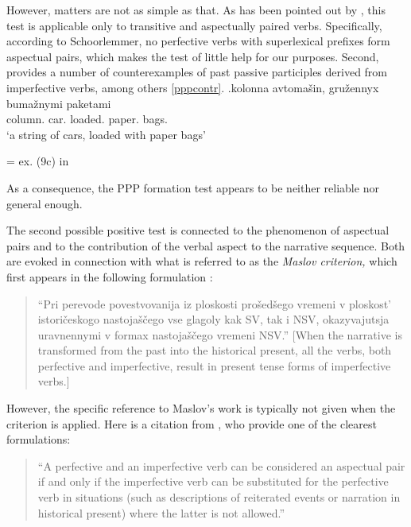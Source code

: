 However, matters are not as simple as that. As has been pointed out by \citet{Schoorlemmer:95}, this test is applicable only to transitive and aspectually paired verbs. Specifically, according to Schoorlemmer, no perfective verbs with superlexical prefixes form aspectual pairs, which makes the test of little help for our purposes. Second, \citet{Romanova:06} provides a number of counterexamples of past passive participles derived from imperfective verbs, among others \ref{pppcontr}.
\exg.\label{pppcontr}kolonna avtoma\v{s}in, gru\v{z}ennyx buma\v{z}nymi paketami \\
column. car. loaded. paper. bags.\\
\vspace{0.5em}
`a string of cars, loaded with paper bags'\\
\vspace{-0.5em}
\begin{flushright}
= ex. (9c) in \citet[5]{Romanova:06}
\end{flushright}

As a consequence, the PPP formation test appears to be neither reliable nor general enough.

The second possible positive test is connected to the phenomenon of aspectual pairs and to the contribution of the verbal aspect to the narrative sequence. Both are evoked in connection with what is referred to as the \textit{Maslov criterion,} which first appears in the following formulation \citep[][76--77]{Maslov:04}: 
\begin{quote}
``Pri perevode povestvovanija iz ploskosti pro\v{s}ed\v{s}ego vremeni v ploskost' istori\v{c}eskogo nastoja\v{s}\v{c}ego vse glagoly kak SV, tak i NSV, okazyvajutsja uravnennymi v formax nastoja\v{s}\v{c}ego vremeni NSV.'' [When the narrative is transformed from the past into the historical present, all the verbs, both perfective and imperfective, result in present tense forms of imperfective verbs.] 
\end{quote}
However, the specific reference to Maslov's work is typically not given when the criterion is applied. Here is a citation from \citet[1]{Mikaelian:07}, who provide one of the clearest formulations:

\begin{quote}
``A perfective and an imperfective verb can be considered an aspectual pair if and only if the imperfective verb can be substituted for the perfective verb in situations (such as descriptions of reiterated events or narration in historical present) where the latter is not allowed.'' 
\end{quote}

